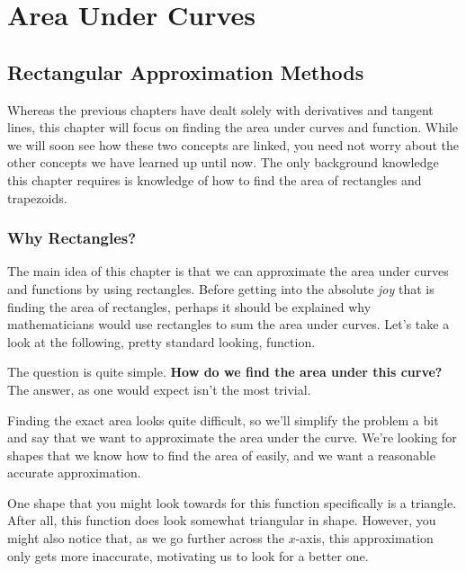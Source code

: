 \chapter{Area Under Curves}

\section{Rectangular Approximation Methods}

Whereas the previous chapters have dealt solely with derivatives and tangent lines, this chapter will focus on finding the area under curves and function. While we will soon see how these two concepts are linked, you need not worry about the other concepts we have learned up until now. The only background knowledge this chapter requires is knowledge of how to find the area of rectangles and trapezoids.

\subsection{Why Rectangles?}

The main idea of this chapter is that we can approximate the area under curves and functions by using rectangles. Before getting into the absolute \textit{joy} that is finding the area of rectangles, perhaps it should be explained why mathematicians would use rectangles to sum the area under curves. Let's take a look at the following, pretty standard looking, function.

\begin{figure}[H]
    \centering
    
\end{figure}

The question is quite simple. \textbf{How do we find the area under this curve?} The answer, as one would expect isn't the most trivial.

Finding the exact area looks quite difficult, so we'll simplify the problem a bit and say that we want to approximate the area under the curve. We're looking for shapes that we know how to find the area of easily, and we want a reasonable accurate approximation.

One shape that you might look towards for this function specifically is a triangle. After all, this function does look somewhat triangular in shape. However, you might also notice that, as we go further across the \( x \)-axis, this approximation only gets more inaccurate, motivating us to look for a better one.

